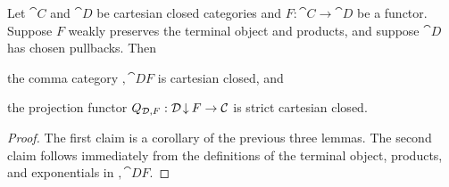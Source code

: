 \begin{prop} \label{prop:gluing-category-ccc}
Let $\cat{C}$ and $\cat{D}$ be cartesian closed categories and $F : \cat{C} \to \cat{D}$ be a functor. Suppose $F$ weakly preserves the terminal object and products, and suppose $\cat{D}$ has chosen pullbacks. Then
\begin{enum}
\item the comma category $\comma{\cat{D}}{F}$ is cartesian closed, and
\item the projection functor $Q_{\mathcal{D}, F} : \mathcal{D} \mathbin{\hspace{-1pt}\downarrow} F \to \mathcal{C}$ is strict cartesian closed.
\end{enum} 
\begin{proof}
The first claim is a corollary of the previous three lemmas. The second claim follows immediately from the definitions of the terminal object, products, and exponentials in $\comma{\cat{D}}{F}$.
\end{proof}
\end{prop}
